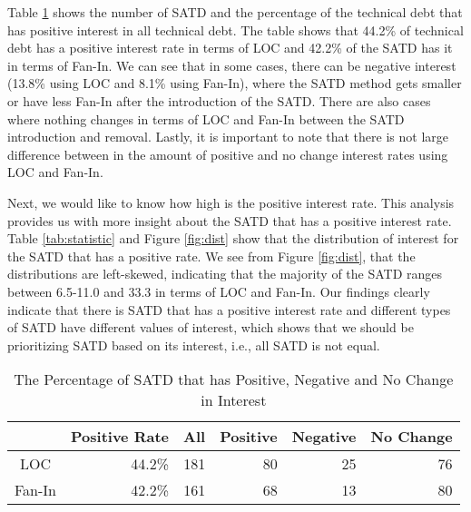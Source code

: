 
Table \ref{tab:percentage} shows the number of SATD and the percentage of the technical debt that has positive interest in all technical debt. The table shows that 44.2\% of technical debt has a positive interest rate in terms of LOC and 42.2\% of the SATD has it in terms of Fan-In. We can see that in some cases, there can be negative interest (13.8\% using LOC and 8.1\% using Fan-In), where the SATD method gets smaller or have less Fan-In after the introduction of the SATD. There are also cases where nothing changes in terms of LOC and Fan-In between the SATD introduction and removal. Lastly, it is important to note that there is not large difference between in the amount of positive and no change interest rates using LOC and Fan-In. 

Next, we would like to know how high is the positive interest rate. This analysis provides us with more insight about the SATD that has a positive interest rate.
Table \ref{tab:statistic} and Figure \ref{fig:dist} show that the distribution of interest for the SATD that has a positive rate. We see from Figure \ref{fig:dist}, that the distributions are left-skewed, indicating that the majority of the SATD ranges between 6.5-11.0 and 33.3 in terms of LOC and Fan-In. Our findings clearly indicate that there is SATD that has a positive interest rate and different types of SATD have different values of interest, which shows that we should be prioritizing SATD based on its interest, i.e., all SATD is not equal.



\begin{table}[tb]
  \caption{The Percentage of SATD that has Positive, Negative and No Change in Interest}
  \label{tab:percentage}
  \centering

  \begin{tabular}{c|r|rrrr}
  \hline
        & \textbf{Positive Rate} & \textbf{All} & \textbf{Positive} & \textbf{Negative} & \textbf{No Change} \\
  \hline
   LOC  & 44.2\% & 181 &  80  &  25 & 76\\
Fan-In  & 42.2\% & 161 &  68  &  13 & 80\\
  \hline
  \end{tabular}
\end{table}

